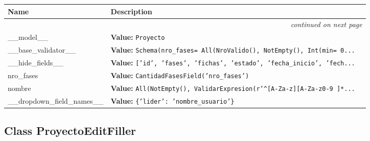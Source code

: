     \vspace{-1cm}
\hspace{\varindent}\begin{longtable}{|p{\varnamewidth}|p{\vardescrwidth}|l}
\cline{1-2}
\cline{1-2} \centering \textbf{Name} & \centering \textbf{Description}& \\
\cline{1-2}
\endhead\cline{1-2}\multicolumn{3}{r}{\small\textit{continued on next page}}\\\endfoot\cline{1-2}
\endlastfoot\raggedright \_\-\_\-m\-o\-d\-e\-l\-\_\-\_\- & \raggedright \textbf{Value:} 
{\tt Proyecto}&\\
\cline{1-2}
\raggedright \_\-\_\-b\-a\-s\-e\-\_\-v\-a\-l\-i\-d\-a\-t\-o\-r\-\_\-\_\- & \raggedright \textbf{Value:} 
{\tt Schema(nro\_fases= All(NroValido(), NotEmpty(), Int(min= 0\texttt{...}}&\\
\cline{1-2}
\raggedright \_\-\_\-h\-i\-d\-e\-\_\-f\-i\-e\-l\-d\-s\-\_\-\_\- & \raggedright \textbf{Value:} 
{\tt ['id', 'fases', 'fichas', 'estado', 'fecha\_inicio', 'fech\texttt{...}}&\\
\cline{1-2}
\raggedright n\-r\-o\-\_\-f\-a\-s\-e\-s\- & \raggedright \textbf{Value:} 
{\tt CantidadFasesField('nro\_fases')}&\\
\cline{1-2}
\raggedright n\-o\-m\-b\-r\-e\- & \raggedright \textbf{Value:} 
{\tt All(NotEmpty(), ValidarExpresion(r'{\textasciicircum}[A-Za-z][A-Za-z0-9 ]*\texttt{...}}&\\
\cline{1-2}
\raggedright \_\-\_\-d\-r\-o\-p\-d\-o\-w\-n\-\_\-f\-i\-e\-l\-d\-\_\-n\-a\-m\-e\-s\-\_\-\_\- & \raggedright \textbf{Value:} 
{\tt \{'lider': 'nombre\_usuario'\}}&\\
\cline{1-2}
\end{longtable}



\subsection{Class ProyectoEditFiller}

